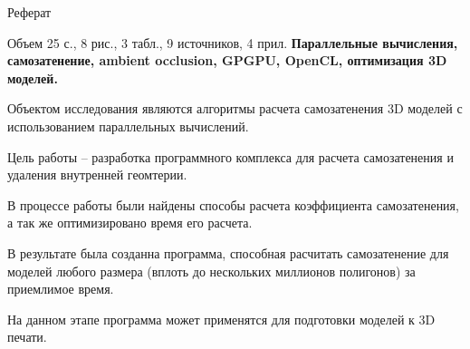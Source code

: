 \titlepage
\clearpage
\begin{center}\Large{Реферат}\end{center}
Объем 25 с., 8 рис., 3 табл., 9 источников, 4 прил.\newline
{\bf Параллельные вычисления, самозатенение, ambient occlusion, GPGPU, OpenCL, оптимизация 3D моделей.}\newline
	
Объектом исследования являются алгоритмы расчета самозатенения 3D моделей с использованием параллельных вычислений.

	Цель работы – разработка программного комплекса для расчета самозатенения и удаления внутренней геомтерии.

	В процессе работы были найдены способы расчета коэффициента самозатенения, а так же оптимизировано время его расчета.

	В результате была созданна программа, способная расчитать самозатенение для моделей любого размера (вплоть до нескольких миллионов полигонов) за приемлимое время.
	
На данном этапе программа может применятся для подготовки моделей к 3D печати.